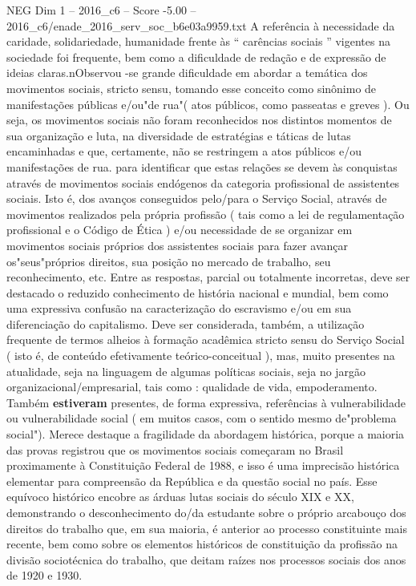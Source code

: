 \begin{textsample}{NEG Dim 1 – 2016\_c6 – Score -5.00 – 2016\_c6/enade\_2016\_serv\_soc\_b6e03a9959.txt}
A referência à necessidade da caridade, solidariedade, humanidade frente às “ carências sociais ” vigentes na sociedade foi frequente, bem como a dificuldade de redação e de expressão de ideias claras.nObservou -se grande dificuldade em abordar a temática dos movimentos sociais, stricto sensu, tomando esse conceito como sinônimo de manifestações públicas e/ou"de rua"( atos públicos, como passeatas e greves ).
Ou seja, os movimentos sociais não foram reconhecidos nos distintos momentos de sua organização e luta, na diversidade de estratégias e táticas de lutas encaminhadas e que, certamente, não se restringem a atos públicos e/ou manifestações de rua. para identificar que estas relações se devem às conquistas através de movimentos sociais endógenos da categoria profissional de assistentes sociais.
Isto é, dos avanços conseguidos pelo/para o Serviço Social, através de movimentos realizados pela própria profissão ( tais como a lei de regulamentação profissional e o Código de Ética ) e/ou necessidade de se organizar em movimentos sociais próprios dos assistentes sociais para fazer avançar os"seus"próprios direitos, sua posição no mercado de trabalho, seu reconhecimento, etc.
Entre as respostas, parcial ou totalmente incorretas, deve ser destacado o reduzido conhecimento de história nacional e mundial, bem como uma expressiva confusão na caracterização do escravismo e/ou em sua diferenciação do capitalismo.
Deve ser considerada, também, a utilização frequente de termos alheios à formação acadêmica stricto sensu do Serviço Social ( isto é, de conteúdo efetivamente teórico-conceitual ), mas, muito presentes na atualidade, seja na linguagem de algumas políticas sociais, seja no jargão organizacional/empresarial, tais como : qualidade de vida, empoderamento.
Também \textbf{estiveram} presentes, de forma expressiva, referências à vulnerabilidade ou vulnerabilidade social ( em muitos casos, com o sentido mesmo de"problema social").
Merece destaque a fragilidade da abordagem histórica, porque a maioria das provas registrou que os movimentos sociais começaram no Brasil proximamente à Constituição Federal de 1988, e isso é uma imprecisão histórica elementar para compreensão da República e da questão social no país.
Esse equívoco histórico encobre as árduas lutas sociais do século XIX e XX, demonstrando o desconhecimento do/da estudante sobre o próprio arcabouço dos direitos do trabalho que, em sua maioria, é anterior ao processo constituinte mais recente, bem como sobre os elementos históricos de constituição da profissão na divisão sociotécnica do trabalho, que deitam raízes nos processos sociais dos anos de 1920 e 1930.

\end{textsample}
